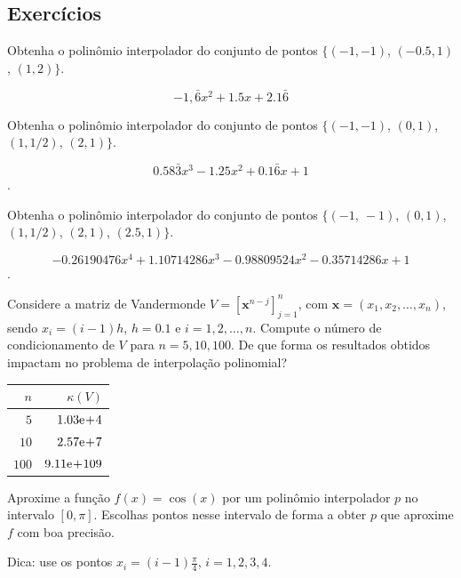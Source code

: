 \subsection{Exercícios}

\begin{exer}
  Obtenha o polinômio interpolador do conjunto de pontos 
  $\{(-1, -1)$, $(-0.5, 1)$, $(1, 2)\}$.
\end{exer}
\begin{resp}
  $$-1,\bar{6}x^2 + 1.5x + 2.1\bar{6}$$
\end{resp}

\begin{exer}
  Obtenha o polinômio interpolador do conjunto de pontos $\{(-1, -1)$, $(0, 1)$, $(1, 1/2)$, $(2, 1)\}$.
\end{exer}
\begin{resp}
  $$0.58\bar{3}x^3 - 1.25x^2 + 0.1\bar{6}x + 1$$. 
\end{resp}

\begin{exer}
  Obtenha o polinômio interpolador do conjunto de pontos $\{(-1,~-1)$, $(0, 1)$, $(1, 1/2)$, $(2, 1)$, $(2.5, 1)\}$.
\end{exer}
\begin{resp}
  $$-0.26190476x^4 + 1.10714286x^3 - 0.98809524x^2 - 0.35714286x  + 1$$.  
\end{resp}

\begin{exer}
  Considere a matriz de Vandermonde $V = [\pmb{x}^{n-j}]_{j=1}^{n}$, com $\pmb{x} = (x_1, x_2, \dotsc, x_n)$, sendo $x_i = (i-1)h$, $h=0.1$ e $i = 1, 2, \dotsc, n$. Compute o número de condicionamento de $V$ para $n=5, 10, 100$. De que forma os resultados obtidos impactam no problema de interpolação polinomial?
\end{exer}
\begin{resp}

  \begin{tabular}{rr}
    $n$ & $\kappa(V)$\\\midrule
    $5$ & $1.03\mathrm{e}\!+\!4$\\
    $10$ & $2.57\mathrm{e}\!+\!7$\\
    $100$ & $9.11\mathrm{e}\!+\!109$\\\bottomrule
  \end{tabular}

\end{resp}

\begin{exer}
  Aproxime a função $f(x) = \cos(x)$ por um polinômio interpolador $p$ no intervalo $[0, \pi]$. Escolhas pontos nesse intervalo de forma a obter $p$ que aproxime $f$ com boa precisão.
\end{exer}
\begin{resp}
  Dica: use os pontos $x_i = (i-1)\frac{\pi}{4}$, $i = 1, 2, 3, 4$.
\end{resp}

